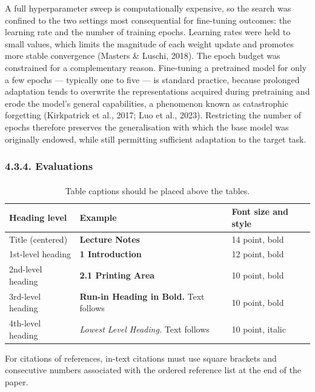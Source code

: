 \documentclass[runningheads]{llncs}
\begin{document}
A full hyperparameter sweep is computationally expensive, so the search was confined to the two settings most consequential for fine-tuning outcomes: the learning rate and the number of training epochs. Learning rates were held to small values, which limits the magnitude of each weight update and promotes more stable convergence (Masters & Luschi, 2018). The epoch budget was constrained for a complementary reason. Fine-tuning a pretrained model for only a few epochs — typically one to five — is standard practice, because prolonged adaptation tends to overwrite the representations acquired during pretraining and erode the model's general capabilities, a phenomenon known as catastrophic forgetting (Kirkpatrick et al., 2017; Luo et al., 2023). Restricting the number of epochs therefore preserves the generalisation with which the base model was originally endowed, while still permitting sufficient adaptation to the target task.


\subsubsection{4.3.4. Evaluations}





\paragraph{}



\begin{table}
\caption{Table captions should be placed above the
tables.}\label{tab1}
\begin{tabular}{|l|l|l|}
\hline
Heading level &  Example & Font size and style\\
\hline
Title (centered) &  {\Large\bfseries Lecture Notes} & 14 point, bold\\
1st-level heading &  {\large\bfseries 1 Introduction} & 12 point, bold\\
2nd-level heading & {\bfseries 2.1 Printing Area} & 10 point, bold\\
3rd-level heading & {\bfseries Run-in Heading in Bold.} Text follows & 10 point, bold\\
4th-level heading & {\itshape Lowest Level Heading.} Text follows & 10 point, italic\\
\hline
\end{tabular}
\end{table}

For citations of references, in-text citations must use square brackets
and consecutive numbers associated with the ordered reference list at 
the end of the paper.
\end{document}
